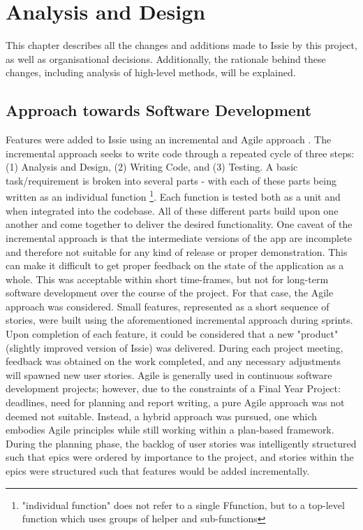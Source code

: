 \chapter{Analysis and Design}
This chapter describes all the changes and additions made to Issie by this project, as well as organisational decisions. Additionally, the rationale behind these changes, including analysis of high-level methods, will be explained. 
\section{Approach towards Software Development}
Features were added to Issie using an incremental and Agile approach \cite{Voorhees2020}.
The incremental approach seeks to write code through a repeated cycle of three steps: (1) Analysis and Design, (2) Writing Code, and (3) Testing. A basic task/requirement is  broken into several parts - with each of these parts being written as an individual function \footnote{"individual function" does not refer to a single F\fsharp function, but to a top-level function which uses groups of helper and sub-functions}. Each function is tested both as a unit and when integrated into the codebase. All of these different parts build upon one another and come together to deliver the desired functionality. One caveat of the incremental approach is that the intermediate versions of the app are incomplete and therefore not suitable for any kind of release or proper demonstration. This can make it difficult to get proper feedback on the state of the application as a whole. This was acceptable within short time-frames, but not for long-term software development over the course of the project. For that case, the Agile approach was considered. Small features, represented as a short sequence of stories, were built using the aforementioned incremental approach during sprints. Upon completion of each feature, it could be considered that a new "product" (slightly improved version of Issie) was delivered. During each project meeting, feedback was obtained on the work completed, and any necessary adjustments will spawned new user stories. Agile is generally used in continuous software development projects; however, due to the constraints of a Final Year Project: deadlines, need for planning and report writing, a pure Agile approach was not deemed not suitable. Instead, a hybrid approach was pursued, one which embodies Agile principles while still working within a plan-based framework. During the planning phase, the backlog of user stories was intelligently structured such that epics were ordered by importance to the project, and stories within the epics were structured such that features would be added incrementally.

